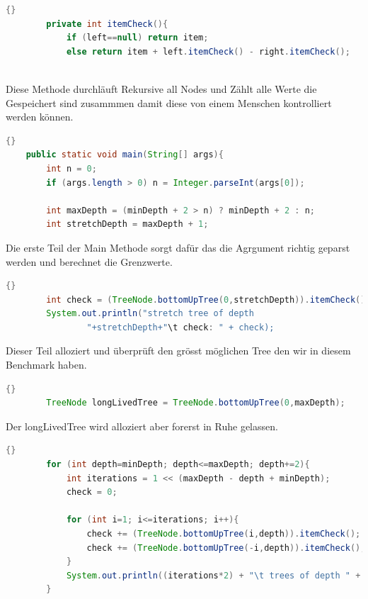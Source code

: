 \documentclass{fancydocument}
\begin{document}
\begin{lstlisting}[language=java,caption=Tree check]{}
		private int itemCheck(){
			if (left==null) return item;
			else return item + left.itemCheck() - right.itemCheck();
		
\end{lstlisting}

Diese Methode durchl\"auft Rekursive all Nodes und Z\"ahlt alle Werte
die Gespeichert sind zusammmen damit diese von einem Menschen kontrolliert
werden können.
\\
\begin{lstlisting}[language=java,caption=Argumente und Tiefenrechnung]{}
	public static void main(String[] args){
		int n = 0;
		if (args.length > 0) n = Integer.parseInt(args[0]);
		
		int maxDepth = (minDepth + 2 > n) ? minDepth + 2 : n;
		int stretchDepth = maxDepth + 1;
\end{lstlisting}

Die erste Teil der Main Methode sorgt daf\"ur das die Agrgument
richtig geparst werden und berechnet die Grenzwerte.

\begin{lstlisting}[language=java,caption=Memory streckung]{}
		int check = (TreeNode.bottomUpTree(0,stretchDepth)).itemCheck();
		System.out.println("stretch tree of depth
                "+stretchDepth+"\t check: " + check);
\end{lstlisting}

Dieser Teil alloziert und \"uberpr\"uft den gr\"osst m\"oglichen  Tree den wir in diesem
Benchmark haben.

\begin{lstlisting}[language=java,caption=Long-Lived-Tree]{}
		TreeNode longLivedTree = TreeNode.bottomUpTree(0,maxDepth);
\end{lstlisting}

Der longLivedTree wird alloziert aber forerst in Ruhe gelassen.

\begin{lstlisting}[language=java,caption=Main Loop]{}
		for (int depth=minDepth; depth<=maxDepth; depth+=2){
			int iterations = 1 << (maxDepth - depth + minDepth);
			check = 0;
			
			for (int i=1; i<=iterations; i++){
				check += (TreeNode.bottomUpTree(i,depth)).itemCheck();
				check += (TreeNode.bottomUpTree(-i,depth)).itemCheck();
			}
			System.out.println((iterations*2) + "\t trees of depth " + depth + "\t check: " + check);
		}	
\end{lstlisting}
\end{document}
